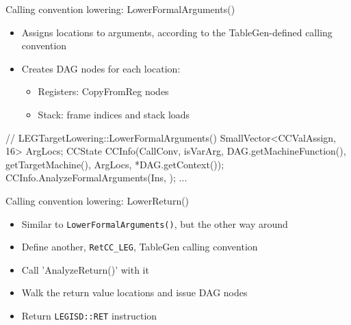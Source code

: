
\begin{frame}[fragile]{Calling convention lowering: LowerFormalArguments()}

\begin{itemize}
    \item Assigns locations to arguments, according to the TableGen-defined calling convention
    \item Creates DAG nodes for each location:
    \begin{itemize}
        \item Registers: CopyFromReg nodes
        \item Stack: frame indices and stack loads
    \end{itemize}
\end{itemize}

\begin{codebox}[commandchars=\\\[\]]
// LEGTargetLowering::LowerFormalArguments()
SmallVector<CCValAssign, 16> ArgLocs;
CCState CCInfo(CallConv, isVarArg, DAG.getMachineFunction(),
               getTargetMachine(), ArgLocs,
               *DAG.getContext());
CCInfo.AnalyzeFormalArguments(Ins, \codeempha[CC_LEG]);
...
\end{codebox}

\end{frame}


\begin{frame}{Calling convention lowering: LowerReturn()}

\begin{itemize}
    \item Similar to \texttt{LowerFormalArguments()}, but the other way around
    \item Define another, \texttt{RetCC\_LEG}, TableGen calling convention
    \item Call 'AnalyzeReturn()' with it
    \item Walk the return value locations and issue DAG nodes
    \item Return \texttt{LEGISD::RET} instruction
\end{itemize}

\end{frame}


